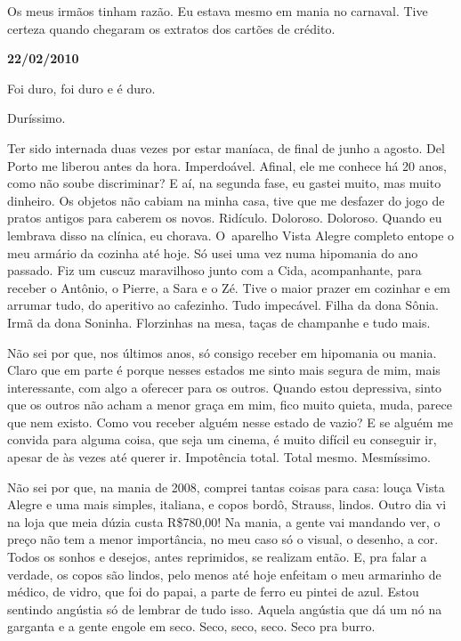 Os meus irmãos tinham razão. Eu estava mesmo em mania no carnaval. Tive
certeza quando chegaram os extratos dos cartões de crédito.

\begin{center}\textbf{\asterisc{}}\end{center}


\textbf{}

\begin{flushright}\textbf{22/02/2010}\end{flushright}


Foi duro, foi duro e é duro.

Duríssimo.

Ter sido internada duas vezes por estar maníaca, de final de junho a
agosto. Del Porto me liberou antes da hora. Imperdoável. Afinal, ele me
conhece há 20 anos, como não soube discriminar? E aí, na segunda fase,
eu gastei muito, mas muito dinheiro. Os objetos não cabiam na minha
casa, tive que me desfazer do jogo de pratos antigos para caberem os
novos. Ridículo. Doloroso. Doloroso. Quando eu lembrava disso na
clínica, eu chorava. O~aparelho Vista Alegre completo entope o meu
armário da cozinha até hoje. Só usei uma vez numa hipomania do ano
passado. Fiz um cuscuz maravilhoso junto com a Cida, acompanhante, para
receber o Antônio, o Pierre, a Sara e o Zé. Tive o maior prazer em
cozinhar e em arrumar tudo, do aperitivo ao cafezinho. Tudo impecável.
Filha da dona Sônia. Irmã da dona Soninha. Florzinhas na mesa, taças de
champanhe e tudo mais.

Não sei por que, nos últimos anos, só consigo receber em hipomania ou
mania. Claro que em parte é porque nesses estados me sinto mais segura
de mim, mais interessante, com algo a oferecer para os outros. Quando
estou depressiva, sinto que os outros não acham a menor graça em mim,
fico muito quieta, muda, parece que nem existo. Como vou receber alguém
nesse estado de vazio? E se alguém me convida para alguma coisa, que
seja um cinema, é muito difícil eu conseguir ir, apesar de às vezes até
querer ir. Impotência total. Total mesmo. Mesmíssimo.

Não sei por que, na mania de 2008, comprei tantas coisas para casa:
louça Vista Alegre e uma mais simples, italiana, e copos bordô, Strauss,
lindos. Outro dia vi na loja que meia dúzia custa R\$780,00! Na mania, a
gente vai mandando ver, o preço não tem a menor importância, no meu caso
só o visual, o desenho, a cor. Todos os sonhos e desejos, antes
reprimidos, se realizam então. E, pra falar a verdade, os copos são
lindos, pelo menos até hoje enfeitam o meu armarinho de médico, de
vidro, que foi do papai, a parte de ferro eu pintei de azul. Estou
sentindo angústia só de lembrar de tudo isso. Aquela angústia que dá um
nó na garganta e a gente engole em seco. Seco, seco, seco. Seco pra
burro.

